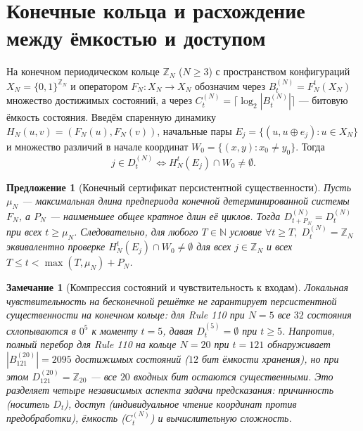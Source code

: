 \documentclass[11pt, a4paper]{article}
\newtheorem{proposition}[theorem]{Предложение}
\newtheorem{remark}[theorem]{Замечание}
\begin{document}
\section{Конечные кольца и расхождение между ёмкостью и доступом}

На конечном периодическом кольце $\mathbb{Z}_N$ ($N \ge 3$) с пространством конфигураций $X_N = \{0, 1\}^{\mathbb{Z}_N}$ и оператором $F_N : X_N \to X_N$ обозначим через $B_t^{(N)} = F_N^t(X_N)$ множество достижимых состояний, а через $C_t^{(N)} = \lceil \log_2 |B_t^{(N)}| \rceil$ — битовую ёмкость состояния. Введём спаренную динамику $H_N(u, v) = (F_N(u), F_N(v))$, начальные пары $E_j = \{ (u, u \oplus e_j) : u \in X_N \}$ и множество различий в начале координат $W_0 = \{ (x, y) : x_0 \ne y_0 \}$. Тогда
\begin{equation}
j \in D_t^{(N)} \iff H_N^t(E_j) \cap W_0 \ne \emptyset.
\end{equation}

\begin{proposition}[Конечный сертификат персистентной существенности]\label{prop:ring_cert}
Пусть $\mu_N$ — максимальная длина предпериода конечной детерминированной системы $F_N$, а $P_N$ — наименьшее общее кратное длин её циклов. Тогда $D_{t+P_N}^{(N)} = D_t^{(N)}$ при всех $t \ge \mu_N$. Следовательно, для любого $T \in \mathbb{N}$ условие $\forall t \ge T,\; D_t^{(N)} = \mathbb{Z}_N$ эквивалентно проверке $H_N^t(E_j) \cap W_0 \ne \emptyset$ для всех $j \in \mathbb{Z}_N$ и всех $T \le t < \max(T, \mu_N) + P_N$.
\end{proposition}

\begin{remark}[Компрессия состояний и чувствительность к входам]
Локальная чувствительность на бесконечной решётке не гарантирует персистентной существенности на конечном кольце: для Rule 110 при $N = 5$ все $32$ состояния схлопываются в $0^5$ к моменту $t = 5$, давая $D_t^{(5)} = \emptyset$ при $t \ge 5$. Напротив, полный перебор для Rule 110 на кольце $N = 20$ при $t = 121$ обнаруживает $|B_{121}^{(20)}| = 2095$ достижимых состояний ($12$ бит ёмкости хранения), но при этом $D_{121}^{(20)} = \mathbb{Z}_{20}$ — все $20$ входных бит остаются существенными. Это разделяет четыре независимых аспекта задачи предсказания: \emph{причинность} (носитель $D_t$), \emph{доступ} (индивидуальное чтение координат против предобработки), \emph{ёмкость} ($C_t^{(N)}$) и \emph{вычислительную сложность}.
\end{remark}
\end{document}
